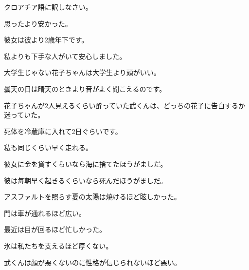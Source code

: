 
\author{Tomislav Mamić}

	
	\noindent
	クロアチア語に訳しなさい。
	\vspace{-10pt}
	
	\begin{mondai}{}
		\Large
		\item 思ったより安かった。
		\item 彼女は彼より2歳年下です。
		\item 私よりも下手な人がいて安心しました。
		\item 大学生じゃない花子ちゃんは大学生より頭がいい。
		\item 曇天の日は晴天のときより音がよく聞こえるのです。
	\end{mondai}

	\begin{mondai}{}
		\Large
		\item 花子ちゃんが2人見えるくらい酔っていた武くんは、どっちの花子に告白するか迷っていた。
		\item 死体を冷蔵庫に入れて2日ぐらいです。
		\item 私も同じくらい早く走れる。
		\item 彼女に金を貸すくらいなら海に捨てたほうがましだ。
		\item 彼は毎朝早く起きるくらいなら死んだほうがましだ。
	\end{mondai}

	\begin{mondai}{}
		\Large
		\item アスファルトを照らす夏の太陽は焼けるほど眩しかった。
		\item 門は車が通れるほど広い。
		\item 最近は目が回るほど忙しかった。
		\item 氷は私たちを支えるほど厚くない。
		\item 武くんは顔が悪くないのに性格が信じられないほど悪い。
	\end{mondai}
